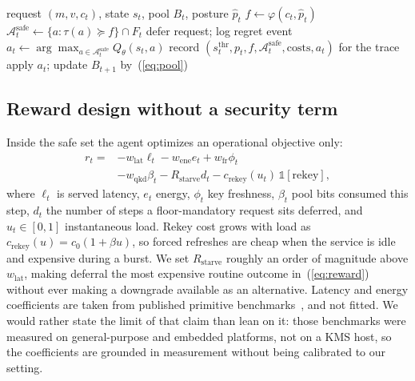 \documentclass[conference]{IEEEtran}
\begin{document}
\begin{algorithm}[t]
\caption{Per-request decision}
\label{alg:decision}
\begin{algorithmic}[1]
\Require request $(m, v, c_t)$, state $s_t$, pool $B_t$, posture $\hat{p}_t$
\State $f \gets \varphi(c_t, \hat{p}_t)$ 
\State $\mathcal{A}^{\text{safe}}_t \gets \{ a : \tau(a) \succeq f \} \cap F_t$
    \State defer request; log regret event 
    \State \Return
\EndIf
\State $a_t \gets \arg\max_{a \in \mathcal{A}^{\text{safe}}_t} Q_\theta(s_t, a)$
\State record $(s^{\text{thr}}_t, p_t, f, \mathcal{A}^{\text{safe}}_t, \text{costs}, a_t)$ for the trace
\State apply $a_t$; update $B_{t+1}$ by~(\ref{eq:pool})
\end{algorithmic}
\end{algorithm}

\subsection{Reward design without a security term}

Inside the safe set the agent optimizes an operational
objective only:
\begin{align}
r_t = {} & -w_{\text{lat}} \ell_t - w_{\text{ene}} e_t + w_{\text{fr}} \phi_t \nonumber \\
         & - w_{\text{qkd}} \beta_t - R_{\text{starve}} d_t - c_{\text{rekey}}(u_t)\, \mathbb{1}[\text{rekey}],
\label{eq:reward}
\end{align}
where $\ell_t$ is served latency, $e_t$ energy, $\phi_t$ key freshness, $\beta_t$
pool bits consumed this step, $d_t$ the number of steps a floor-mandatory request sits deferred, and $u_t \in [0,1]$ instantaneous
load. Rekey cost grows with load as $c_{\text{rekey}}(u) = c_0(1 + \beta u)$,
so forced refreshes are cheap when the service is idle and
expensive during a burst. We set $R_{\text{starve}}$ roughly an order of
magnitude above $w_{\text{lat}}$, making deferral the most expensive
routine outcome in~(\ref{eq:reward}) without ever making a downgrade
available as an alternative. Latency and energy coefficients are
taken from published primitive benchmarks~\cite{ref22}, \cite{ref23} and not
fitted. We would rather state the limit of that claim than lean on
it: those benchmarks were measured on general-purpose and
embedded platforms, not on a KMS host, so the coefficients
are grounded in measurement without being calibrated to our
setting.
\end{document}
